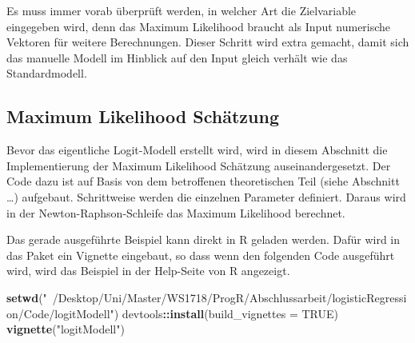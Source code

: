 \documentclass[12pt,]{article}
\newenvironment{Shaded}{\begin{snugshade}}{\end{snugshade}}
\newcommand{\KeywordTok}[1]{\textcolor[rgb]{0.13,0.29,0.53}{\textbf{#1}}}
\newcommand{\DataTypeTok}[1]{\textcolor[rgb]{0.13,0.29,0.53}{#1}}
\newcommand{\StringTok}[1]{\textcolor[rgb]{0.31,0.60,0.02}{#1}}
\newcommand{\OtherTok}[1]{\textcolor[rgb]{0.56,0.35,0.01}{#1}}
\newcommand{\OperatorTok}[1]{\textcolor[rgb]{0.81,0.36,0.00}{\textbf{#1}}}
\newcommand{\NormalTok}[1]{#1}
\begin{document}
Es muss immer vorab überprüft werden, in welcher Art die Zielvariable
eingegeben wird, denn das Maximum Likelihood braucht als Input
numerische Vektoren für weitere Berechnungen. Dieser Schritt wird extra
gemacht, damit sich das manuelle Modell im Hinblick auf den Input gleich
verhält wie das Standardmodell.

\subsection{Maximum Likelihood
Schätzung}\label{maximum-likelihood-schatzung-1}

Bevor das eigentliche Logit-Modell erstellt wird, wird in diesem
Abschnitt die Implementierung der Maximum Likelihood Schätzung
auseinandergesetzt. Der Code dazu ist auf Basis von dem betroffenen
theoretischen Teil (siehe Abschnitt \ldots{}) aufgebaut. Schrittweise
werden die einzelnen Parameter definiert. Daraus wird in der
Newton-Raphson-Schleife das Maximum Likelihood berechnet.

Das gerade ausgeführte Beispiel kann direkt in R geladen werden. Dafür
wird in das Paket ein Vignette eingebaut, so dass wenn den folgenden
Code ausgeführt wird, wird das Beispiel in der Help-Seite von R
angezeigt.

\begin{Shaded}
\begin{Highlighting}[]
\KeywordTok{setwd}\NormalTok{(}\StringTok{"~/Desktop/Uni/Master/WS1718/ProgR/Abschlussarbeit/logisticRegression/Code/logitModell"}\NormalTok{)}
\NormalTok{devtools}\OperatorTok{::}\KeywordTok{install}\NormalTok{(}\DataTypeTok{build_vignettes =} \OtherTok{TRUE}\NormalTok{)}
\KeywordTok{vignette}\NormalTok{(}\StringTok{"logitModell"}\NormalTok{)}
\end{Highlighting}
\end{Shaded}
\end{document}
